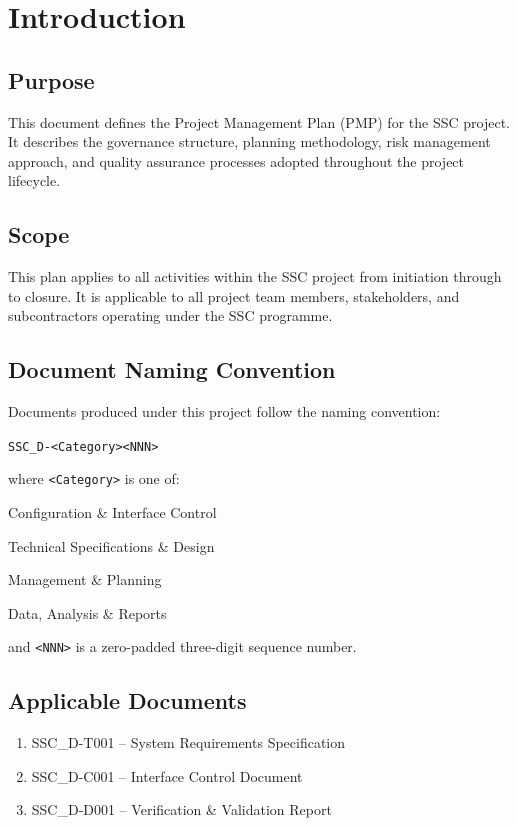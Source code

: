 \documentclass[12pt,a4paper]{article}
\begin{document}
\section{Introduction}

\subsection{Purpose}
This document defines the Project Management Plan (PMP) for the SSC project.
It describes the governance structure, planning methodology, risk management
approach, and quality assurance processes adopted throughout the project
lifecycle.

\subsection{Scope}
This plan applies to all activities within the SSC project from initiation
through to closure. It is applicable to all project team members, stakeholders,
and subcontractors operating under the SSC programme.

\subsection{Document Naming Convention}
Documents produced under this project follow the naming convention:

\begin{center}
  \texttt{SSC\_D-<Category><NNN>}
\end{center}

\noindent where \texttt{<Category>} is one of:

\begin{description}[labelindent=1cm]
  \item[\texttt{C}] Configuration \& Interface Control
  \item[\texttt{T}] Technical Specifications \& Design
  \item[\texttt{M}] Management \& Planning
  \item[\texttt{D}] Data, Analysis \& Reports
\end{description}

\noindent and \texttt{<NNN>} is a zero-padded three-digit sequence number.

\subsection{Applicable Documents}
\begin{enumerate}
  \item SSC\_D-T001 -- System Requirements Specification
  \item SSC\_D-C001 -- Interface Control Document
  \item SSC\_D-D001 -- Verification \& Validation Report
\end{enumerate}
\end{document}
